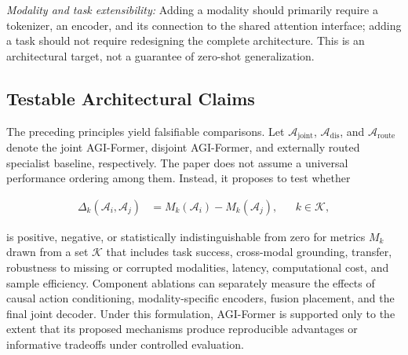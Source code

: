 \textit{Modality and task extensibility:} Adding a modality should primarily require a tokenizer, an encoder, and its connection to the shared attention interface; adding a task should not require redesigning the complete architecture. This is an architectural target, not a guarantee of zero-shot generalization.

\subsection{\textbf{Testable Architectural Claims}}

The preceding principles yield falsifiable comparisons. Let $\mathcal{A}_{\mathrm{joint}}$, $\mathcal{A}_{\mathrm{dis}}$, and $\mathcal{A}_{\mathrm{route}}$ denote the joint AGI-Former, disjoint AGI-Former, and externally routed specialist baseline, respectively. The paper does not assume a universal performance ordering among them. Instead, it proposes to test whether

\begin{equation}
\begin{aligned}
    \Delta_{k}(\mathcal{A}_i,\mathcal{A}_j)
    &= M_k(\mathcal{A}_i)-M_k(\mathcal{A}_j),
    && k\in\mathcal{K},
\end{aligned}
\label{eq:architecture_comparison}
\end{equation}

is positive, negative, or statistically indistinguishable from zero for metrics $M_k$ drawn from a set $\mathcal{K}$ that includes task success, cross-modal grounding, transfer, robustness to missing or corrupted modalities, latency, computational cost, and sample efficiency. Component ablations can separately measure the effects of causal action conditioning, modality-specific encoders, fusion placement, and the final joint decoder. Under this formulation, AGI-Former is supported only to the extent that its proposed mechanisms produce reproducible advantages or informative tradeoffs under controlled evaluation.
